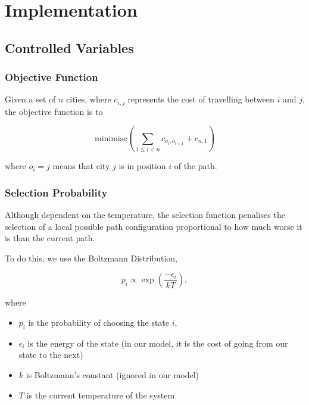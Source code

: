 \documentclass{article}
\begin{document}
\newpage
\section{Implementation}

\subsection{Controlled Variables}

\subsubsection{Objective Function}

Given a set of $n$ cities, where $c_{i,j}$ represents the cost of travelling between $i$ and $j$, the objective function is to

$$\text{minimise}\left( \sum_{1 \leq i < n} c_{o_i, o_{i + 1}} + c_{n, 1}\right)$$

where $o_i = j$ means that city $j$ is in position $i$ of the path.
\\

\subsubsection{Selection Probability}

Although dependent on the temperature, the selection function penalises the selection of a local possible path configuration proportional to how much worse it is than the current path.

To do this, we use the Boltzmann Distribution,

$$p_i \propto \exp \left( \frac{- \epsilon_i}{kT} \right),$$

where
\begin{itemize}
    \item $p_i$ is the probability of choosing the state $i$,
    \item $\epsilon_i$ is the energy of the state (in our model, it is the cost of going from our state to the next)
    \item $k$ is Boltzmann's constant (ignored in our model)
    \item $T$ is the current temperature of the system
\end{itemize}
\end{document}
